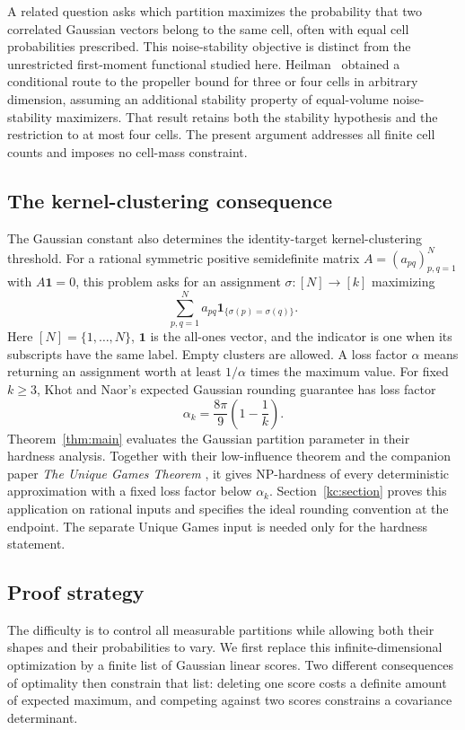 \documentclass[11pt]{article}
\numberwithin{equation}{section}
\theoremstyle{definition}
\theoremstyle{remark}
\newcommand{\one}{\mathbf 1}
\begin{document}
A related question asks which partition maximizes the probability that
two correlated Gaussian vectors belong to the same cell, often with
equal cell probabilities prescribed. This noise-stability objective
is distinct from the unrestricted first-moment functional studied here.
Heilman~\cite[Theorem~1.7]{HeilmanHyper} obtained a conditional route to
the propeller bound for three or four cells in arbitrary dimension,
assuming an additional stability property of equal-volume
noise-stability maximizers. That result retains both the stability
hypothesis and the restriction to at most four cells. The present
argument addresses all finite cell counts and imposes no cell-mass
constraint.

\subsection{The kernel-clustering consequence}
The Gaussian constant also determines the identity-target
kernel-clustering threshold. For a rational symmetric positive
semidefinite matrix $A=(a_{pq})_{p,q=1}^N$ with $A\one=0$, this problem
asks for an assignment $\sigma:[N]\to[k]$ maximizing
\[
 \sum_{p,q=1}^N a_{pq}\one_{\{\sigma(p)=\sigma(q)\}}.
\]
Here $[N]=\{1,\ldots,N\}$, $\one$ is the all-ones vector, and the
indicator is one when its subscripts have the same label. Empty
clusters are allowed. A loss factor $\alpha$ means returning an
assignment worth at least $1/\alpha$ times the maximum value.
For fixed $k\ge3$, Khot and Naor's expected Gaussian rounding guarantee
\cite[Theorem~2.1]{KhotNaor} has loss factor
\[
 \alpha_k=\frac{8\pi}{9}\left(1-\frac1k\right).
\]
Theorem~\ref{thm:main} evaluates the Gaussian partition parameter in
their hardness analysis. Together with their low-influence theorem and
the companion paper \emph{The Unique Games Theorem}
\cite[Theorem~1.1]{UniqueGamesTheorem}, it gives NP-hardness of every
deterministic approximation with a fixed loss factor below $\alpha_k$.
Section~\ref{kc:section} proves this application on rational inputs and
specifies the ideal rounding convention at the endpoint. The separate
Unique Games input is needed only for the hardness statement.

\subsection{Proof strategy}
The difficulty is to control all measurable partitions while allowing
both their shapes and their probabilities to vary. We first replace
this infinite-dimensional optimization by a finite list of Gaussian
linear scores. Two different consequences of optimality then constrain
that list: deleting one score costs a definite amount of expected
maximum, and competing against two scores constrains a covariance
determinant.
\end{document}
